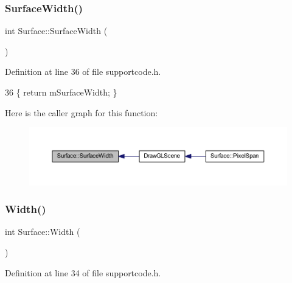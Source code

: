 \subsubsection{\texorpdfstring{Surface\+Width()}{SurfaceWidth()}}
{\footnotesize\ttfamily int Surface\+::\+Surface\+Width (\begin{DoxyParamCaption}{ }\end{DoxyParamCaption})\hspace{0.3cm}{\ttfamily [inline]}}



Definition at line 36 of file supportcode.\+h.


\begin{DoxyCode}
36 \{ \textcolor{keywordflow}{return} mSurfaceWidth;  \}
\end{DoxyCode}
Here is the caller graph for this function\+:\nopagebreak
\begin{figure}[H]
\begin{center}
\leavevmode
\includegraphics[width=350pt]{class_surface_a4cbf23ea0c8ff533271109fc2a1a863d_icgraph}
\end{center}
\end{figure}
\mbox{\label{class_surface_ae76d7c2fa208df6979a77cc60e8105c0}} 
\subsubsection{\texorpdfstring{Width()}{Width()}}
{\footnotesize\ttfamily int Surface\+::\+Width (\begin{DoxyParamCaption}{ }\end{DoxyParamCaption})\hspace{0.3cm}{\ttfamily [inline]}}



Definition at line 34 of file supportcode.\+h.


